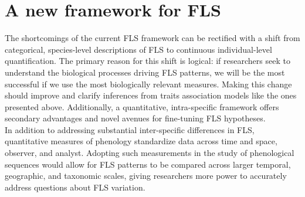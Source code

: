 \documentclass{article}
\begin{document}
\section*{A new framework for FLS}
The shortcomings of the current FLS framework can be rectified with a shift from categorical, species-level descriptions of FLS to continuous individual-level quantification. The primary reason for this shift is logical: if researchers seek to understand the biological processes driving FLS patterns, we will be the most successful if we use the most biologically relevant measures. Making this change should improve and clarify inferences from traits association models like the ones presented above. Additionally, a quantitative, intra-specific framework offers secondary advantages and novel avenues for fine-tuning FLS hypotheses.\\

\noindent In addition to addressing substantial inter-specific differences in FLS, quantitative measures of phenology \citep[e.g. the BBCH scale,][]{Finn2007} standardize data across time and space, observer, and analyst. Adopting such measurements in the study of phenological sequences would allow for FLS patterns to be compared across larger temporal, geographic, and taxonomic scales, giving researchers more power to accurately address questions about FLS variation.\\
\end{document}
